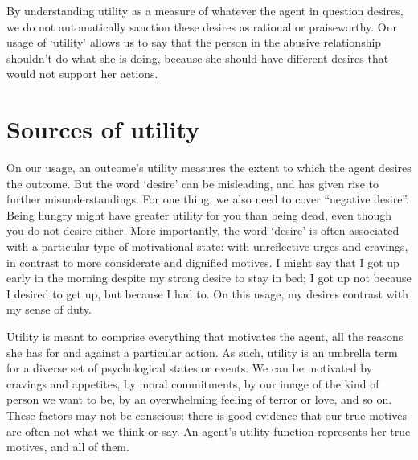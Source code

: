 By understanding utility as a measure of whatever the agent in
question desires, we do not automatically sanction these desires as
rational or praiseworthy. Our usage of `utility' allows us to say that
the person in the abusive relationship shouldn't do what she is doing,
because she should have different desires that would not support her
actions.

\section{Sources of utility}\label{sec:sources-utility}

On our usage, an outcome's utility measures the extent to which the
agent desires the outcome. But the word `desire' can be misleading,
and has given rise to further misunderstandings. For one thing, we
also need to cover ``negative desire''. Being hungry might have
greater utility for you than being dead, even though you do not desire
either. More importantly, the word `desire' is often associated with a
particular type of motivational state: with unreflective urges and
cravings, in contrast to more considerate and dignified motives. I
might say that I got up early in the morning despite my strong desire
to stay in bed; I got up not because I desired to get up, but because
I had to. On this usage, my desires contrast with my sense of duty.

Utility is meant to comprise everything that motivates the agent, all
the reasons she has for and against a particular action. As such,
utility is an umbrella term for a diverse set of psychological
states or events. We can be motivated by cravings and appetites, by
moral commitments, by our image of the kind of person we want to be,
by an overwhelming feeling of terror or love, and so on. These
factors may not be conscious: there is good evidence that our true motives
are often not what we think or say. An agent's utility function
represents her true motives, and all of them.


